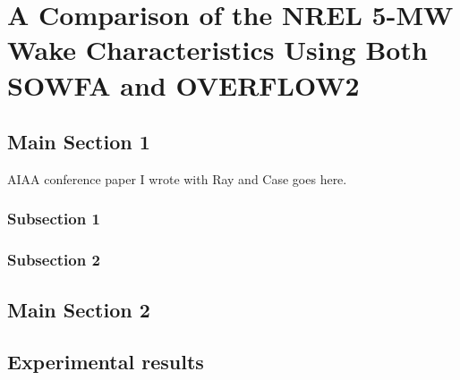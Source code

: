 
\chapter{A Comparison of the NREL 5-MW Wake Characteristics Using Both SOWFA and OVERFLOW2} %

\label{Chapter5} %



\section{Main Section 1}

AIAA conference paper I wrote with Ray and Case goes here.
\subsection{Subsection 1}



\subsection{Subsection 2}



\section{Main Section 2}


\section{Experimental results}


